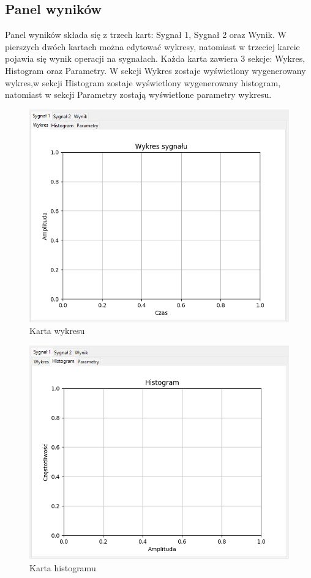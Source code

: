 \documentclass{article}
\begin{document}
\FloatBarrier
\subsection{Panel wyników} 

Panel wyników składa się z trzech kart: Sygnał 1, Sygnał 2 oraz Wynik. W pierszych dwóch kartach można
edytować wykresy, natomiast w trzeciej karcie pojawia się wynik operacji na sygnałach.
Każda karta zawiera 3 sekcje: Wykres, Histogram oraz Parametry. W sekcji Wykres zostaje wyświetlony wygenerowany
wykres,w sekcji Histogram zostaje wyświetlony wygenerowany histogram, natomiast w sekcji Parametry 
zostają wyświetlone parametry wykresu.

\begin{figure}[h!]
    \centering
    \includegraphics[width=\textwidth]{img/wykres.png}
    \caption{Karta wykresu}
\end{figure}
\begin{figure}[h!]
    \centering
    \includegraphics[width=\textwidth]{img/hist.png}
    \caption{Karta histogramu}
\end{figure}
\end{document}
